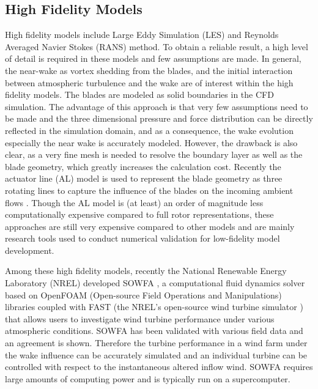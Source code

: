 \documentclass{umthesis}
\begin{document}
\subsection{High Fidelity Models}
High fidelity models include Large Eddy Simulation (LES) \cite{Pope} and Reynolds Averaged Navier Stokes (RANS) method. To obtain a reliable result, a high level of detail is required in these models and few assumptions are made. In general, the near-wake as vortex shedding from the blades, and the initial interaction between atmospheric turbulence and the wake are of interest within the high fidelity models. The blades are modeled as solid boundaries in the CFD simulation. The advantage of this approach is that very few assumptions need to be made and the three dimensional pressure and force distribution can be directly reflected in the simulation domain, and as a consequence, the wake evolution especially the near wake is accurately modeled. However, the drawback is also clear, as a very fine mesh is needed to resolve the boundary layer as well as the blade geometry, which greatly increases the calculation cost. Recently the actuator line (AL) model is used to represent the blade geometry as three rotating lines to capture the influence of the blades on the incoming ambient flows \cite{Sørensen_2002}. Though the AL model is (at least) an order of magnitude less computationally expensive compared to full rotor representations, these approaches are still very expensive compared to other models and are mainly research tools used to conduct numerical validation for low-fidelity model development.

Among these high fidelity models, recently the National Renewable Energy Laboratory (NREL) developed SOWFA \cite{SOWFA}, a computational fluid dynamics solver based on OpenFOAM (Open-source Field Operations and Manipulations) libraries \cite{openfoam} coupled with FAST (the NREL’s open-source wind turbine simulator \cite{FAST}) that allows users to investigate wind turbine performance under various atmospheric conditions. SOWFA has been validated with various field data and an agreement is shown. Therefore the turbine performance in a wind farm under the wake influence can be accurately simulated and an individual turbine can be controlled with respect to the instantaneous altered inflow wind. SOWFA requires large amounts of computing power and is typically run on a supercomputer.
\end{document}
